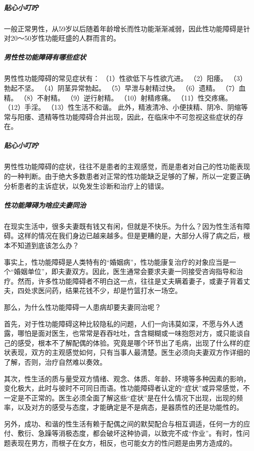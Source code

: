 \begin{enumerate}
\subparagraph{贴心小叮咛}

一般正常男性，从59岁以后随着年龄增长而性功能渐渐减弱，因此性功能障碍是针对20～50岁性功能旺盛的人群而言的。

\subparagraph{男性性功能障碍有哪些症状}

男性性功能障碍的常见症状有： 
 （1）性欲低下与性欲亢进。 
 （2）阳痿。 
 （3）勃起不坚。 
 （4）阴茎异常勃起。 
 （5）早泄与射精过快。 
 （6）遗精。 
 （7）血精。 
 （8）不射精。 
 （9）逆行射精。 
 （10）射精疼痛。 
 （11）性交疼痛。 
 （12）手淫。 
 （13）性生活不和谐。 
 此外，精液清冷、小便挟精、阴冷、阴缩等常与阳痿、遗精等性功能障碍合并出现，因此，在临床中不可忽视这些症状的存在。

\subparagraph{贴心小叮咛}

男性性功能障碍的症状，往往不是患者的主观感觉，而是患者对自己的性功能表现的一种判断。由于绝大多数患者对正常的性功能缺乏足够的了解，所以一定要正确分析患者的主诉症状，以免发生诊断和治疗上的错误。

\subparagraph{性功能障碍为啥应夫妻同治}

在现实生活中，很多夫妻既有钱又有闲，但就是不快乐。为什么？因为性生活有障碍。这样的情况在我们身边已越来越多。但是更糟的是，大部分人得了病之后，根本不知道到底该怎么办？

事实上，性功能障碍是人类特有的“婚姻病”，性功能康复治疗的对象应当是一个“婚姻单位”，即夫妻双方。因此，医生通常会要求夫妻一同接受咨询指导和治疗。然而，许多性功能障碍者不明白这一点，往往是丈夫瞒着妻子，或妻子背着丈夫，四处求医问药，结果花钱不少，却是竹篮打水一场空。

那么，为什么性功能障碍一人患病却要夫妻同治呢？

首先，对于性功能障碍这种比较隐私的问题，人们一向讳莫如深，不愿与外人透露，哪怕是面对医生，也常常是吞吞吐吐，含含糊糊或一味抱怨对方，或只能谈自己的感受，根本不了解配偶的体验。究竟是哪个环节出了毛病，出现了什么样的症状表现，双方的主观感觉如何，只有当事人最清楚。医生必须向夫妻双方作详细的了解，否则，治疗自然难以奏效。

其次，性生活的质与量受双方情绪、观念、体质、年龄、环境等多种因素的影响，变化极大，此时与彼时不可同日而语。性功能障碍者认定的“症状”或异常感觉，不一定是不正常的。医生必须全面了解这些“症状”是在什么情况下出现，出现的频率，以及对方的感受与态度，才能确定是不是病态，是器质性的还是功能性的。

另外，成功、和谐的性生活有赖于配偶之间的默契配合与相互调适，任何一方的应付、敷衍、急躁等消极态度，都会破坏这种协调，以致完不成“作业”。有时，性问题表现在男方，而根子在女方，相反，也可能女方的性问题是由男方造成的。


\end{enumerate}
